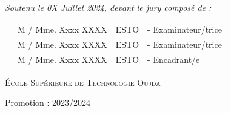 \begin{center}
\begin{minipage}{0.4\textwidth}
\vspace{1cm}

\end{minipage}\\[0.6cm]

{\large \textit{Soutenu le 0X Juillet 2024, devant le jury composé de : }}\\[0.5cm]


\begin{tabular}{p{1cm}lll}
 & \large M / Mme. Xxxx \textsc{XXXX}  & \large ESTO & \large - Examinateur/trice \\[0.1cm]
 & \large M / Mme. Xxxx \textsc{XXXX}  & \large ESTO & \large - Examinateur/trice \\[0.1cm]
 & \large M / Mme. Xxxx \textsc{XXXX}  & \large ESTO & \large - Encadrant/e \\[0.1cm]
 
\end{tabular}

\vspace{1.5cm}


\textsc{École Supérieure de Technologie Oujda}

{\large Promotion : 2023/2024}
   
\end{center}


